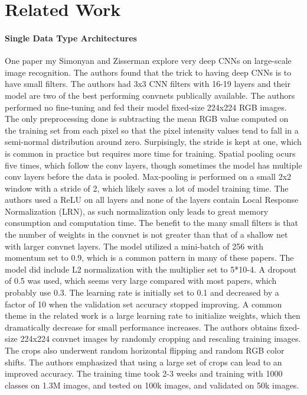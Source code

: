 
\chapter{Related Work}

\subsubsection{Single Data Type Architectures}
One paper my Simonyan and Zisserman explore very deep CNNs on large-scale image recognition.  The authors found that the trick to having deep CNNs is to have small filters.  The authors had 3x3 CNN filters with 16-19 layers and their model are two of the best performing convnets publically available.  The authors performed no fine-tuning and fed their model fixed-size 224x224 RGB images.  The only preprocessing done is subtracting the mean RGB value computed on the training set from each pixel so that the pixel intensity values tend to fall in a semi-normal distribution around zero.  Surpisingly, the stride is kept at one, which is common in practice but requires more time for training.  Spatial pooling ocurs five times, which follow the conv layers, though sometimes the model has multiple conv layers before the data is pooled.  Max-pooling is performed on a small 2x2 window with a stride of 2, which likely saves a lot of model training time.  The authors used a ReLU on all layers and none of the layers contain Local Response Normalization (LRN), as such normalization only leads to great memory consumption and computation time.  The benefit to the many small filters is that the number of weights in the convnet is not greater than that of a shallow net with larger convnet layers.  The model utilized a mini-batch of 256 with momentum set to 0.9, which is a common pattern in many of these papers.  The model did include L2 normalization with the multiplier set to 5*10-4.  A dropout of 0.5 was used, which seems very large compared with most papers, which probably use 0.3.  The learning rate is initially set to 0.1 and decreased by a factor of 10 when the validation set accuracy stopped improving.  A common theme in the related work is a large learning rate to initialize weights, which then dramatically decrease for small performance increases.  The authors obtains fixed-size 224x224 convnet images by randomly cropping and rescaling training images.  The crops also underwent random horizontal flipping and random RGB color shifts.  The authors emphasized that using a large set of crops can lead to an improved accuracy.  The training time took 2-3 weeks and training with 1000 classes on 1.3M images, and tested on 100k images, and validated on 50k images.  

